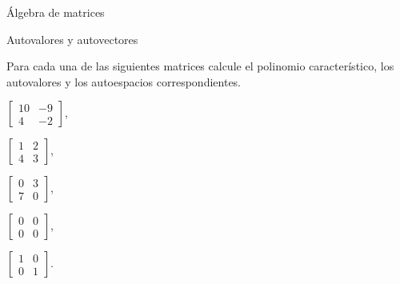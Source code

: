 \begin{chapter}{\'Algebra de matrices}
\begin{section}{Autovalores y autovectores}
        \begin{enumex}
            \item Para cada una de las siguientes matrices calcule el polinomio característico, los autovalores y los autoespacios correspondientes.
                \begin{enumex}
                \begin{minipage}{0.25\textwidth}
                    \item $\begin{bmatrix} 10&-9 \\4 &-2\end{bmatrix}$,
                \end{minipage}
                \begin{minipage}{0.25\textwidth}
                    \item $\begin{bmatrix} 1&2 \\ 4&3\end{bmatrix}$,
                \end{minipage}
                \begin{minipage}{0.25\textwidth}
                    \item $\begin{bmatrix} 0&3 \\7 &0\end{bmatrix}$,
                \end{minipage}

                \begin{minipage}{0.25\textwidth}
                    \item $\begin{bmatrix} 0&0 \\0 &0\end{bmatrix}$,
                \end{minipage}
                \begin{minipage}{0.25\textwidth}
                    \item $\begin{bmatrix} 1&0 \\ 0&1\end{bmatrix}$.
                \end{minipage}
                \end{enumex}
            

\end{enumex}
\end{section}
\end{chapter}
